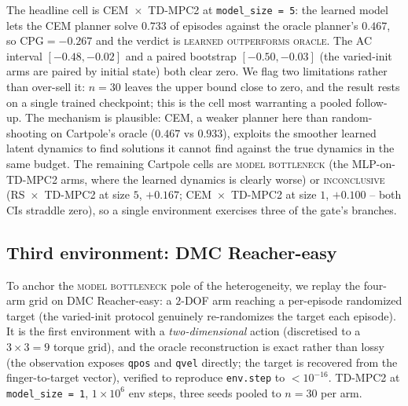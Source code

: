 \documentclass[10pt,letterpaper]{article}
\begin{document}
The headline cell is CEM~$\times$~TD-MPC2 at \texttt{model\_size = 5}: the learned model lets the CEM planner solve $0.733$ of episodes against the oracle planner's $0.467$, so $\mathrm{CPG} = -0.267$ and the verdict is \textsc{learned outperforms oracle}. The AC interval $[-0.48, -0.02]$ and a paired bootstrap $[-0.50, -0.03]$ (the varied-init arms are paired by initial state) both clear zero. We flag two limitations rather than over-sell it: $n = 30$ leaves the upper bound close to zero, and the result rests on a single trained checkpoint; this is the cell most warranting a pooled follow-up. The mechanism is plausible: CEM, a weaker planner here than random-shooting on Cartpole's oracle ($0.467$ vs $0.933$), exploits the smoother learned latent dynamics to find solutions it cannot find against the true dynamics in the same budget. The remaining Cartpole cells are \textsc{model bottleneck} (the MLP-on-TD-MPC2 arms, where the learned dynamics is clearly worse) or \textsc{inconclusive} (RS~$\times$~TD-MPC2 at size $5$, $+0.167$; CEM~$\times$~TD-MPC2 at size $1$, $+0.100$ -- both CIs straddle zero), so a single environment exercises three of the gate's branches.

\subsection{Third environment: DMC Reacher-easy}
\label{sec:reacher}

To anchor the \textsc{model bottleneck} pole of the heterogeneity, we replay the four-arm grid on DMC Reacher-easy: a $2$-DOF arm reaching a per-episode randomized target (the varied-init protocol genuinely re-randomizes the target each episode). It is the first environment with a \emph{two-dimensional} action (discretised to a $3 \times 3 = 9$ torque grid), and the oracle reconstruction is exact rather than lossy (the observation exposes \texttt{qpos} and \texttt{qvel} directly; the target is recovered from the finger-to-target vector), verified to reproduce \texttt{env.step} to $< 10^{-16}$. TD-MPC2 at \texttt{model\_size = 1}, $1 \times 10^{6}$ env steps, three seeds pooled to $n = 30$ per arm.
\end{document}
